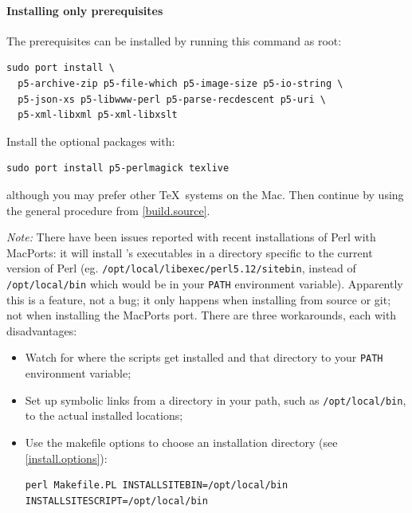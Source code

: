 \documentclass{article}
\begin{document}

\paragraph{Installing only prerequisites}
The prerequisites can be installed by running this command as root: 
\begin{lstlisting}[style=shell]
sudo port install \
  p5-archive-zip p5-file-which p5-image-size p5-io-string \
  p5-json-xs p5-libwww-perl p5-parse-recdescent p5-uri \
  p5-xml-libxml p5-xml-libxslt
\end{lstlisting}
Install the optional packages with:
\begin{lstlisting}[style=shell]
sudo port install p5-perlmagick texlive
\end{lstlisting}
although you may prefer other \TeX\ systems on the Mac.
Then continue by using the general procedure from \ref{build.source}.


\emph{Note:} There have been issues reported with recent
installations of Perl with MacPorts:  it will install \LaTeXML's
executables in a directory specific to the current version of Perl
(eg. \texttt{/opt/local/libexec/perl5.12/sitebin},
instead of \texttt{/opt/local/bin} which would be in your \texttt{PATH} environment variable).
Apparently this is a feature, not a bug; it only happens when installing from source or git;
not when installing the MacPorts port.  There are three workarounds, each with disadvantages:
\begin{itemize}
\item Watch for where the scripts get installed and that directory to your \texttt{PATH}
  environment variable;
\item Set up symbolic links from a directory in your path, such as \texttt{/opt/local/bin},
  to the actual installed locations;
\item Use the makefile options to choose an installation directory (see \ref{install.options}):
\begin{lstlisting}[style=shell]
perl Makefile.PL INSTALLSITEBIN=/opt/local/bin INSTALLSITESCRIPT=/opt/local/bin
\end{lstlisting}
\end{itemize}
\end{document}
